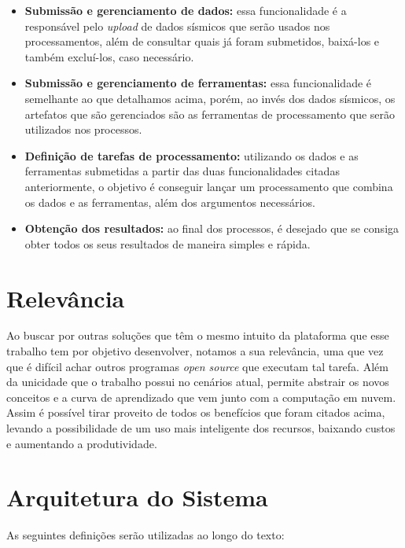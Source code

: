 \documentclass[11pt,twoside]{article}
\begin{document}
\begin{itemize}
  \item \textbf{Submissão e gerenciamento de dados:} essa funcionalidade é a responsável pelo \emph{upload} de dados sísmicos que serão usados nos processamentos, além de consultar quais já foram submetidos, baixá-los e também
  excluí-los, caso necessário. 
  \item \textbf{Submissão e gerenciamento de ferramentas:} essa funcionalidade é semelhante ao que detalhamos acima, porém, ao invés dos dados sísmicos, os artefatos que são gerenciados são as 
  ferramentas de processamento que serão utilizados nos processos.
  \item \textbf{Definição de tarefas de processamento:} utilizando os dados e as ferramentas submetidas a partir das duas funcionalidades citadas anteriormente, o objetivo é conseguir lançar um processamento que combina os dados e 
  as ferramentas, além dos argumentos necessários.
  \item \textbf{Obtenção dos resultados:} ao final dos processos, é desejado que se consiga obter todos os seus resultados de maneira simples e rápida.
\end{itemize}

\section{Relevância}
Ao buscar por outras soluções que têm o mesmo intuito da plataforma que esse trabalho tem por objetivo desenvolver, notamos a sua relevância, uma que vez que é difícil achar outros programas \emph{open source} que executam tal tarefa.
Além da unicidade que o trabalho possui no cenários atual, permite abstrair os novos conceitos e a curva de aprendizado que vem junto com a computação em nuvem. Assim é possível
tirar proveito de todos os benefícios que foram citados acima, levando a possibilidade de um uso mais inteligente dos recursos, baixando custos e aumentando a produtividade.

\section{Arquitetura do Sistema}

As seguintes definições serão utilizadas ao longo do texto:
\end{document}
